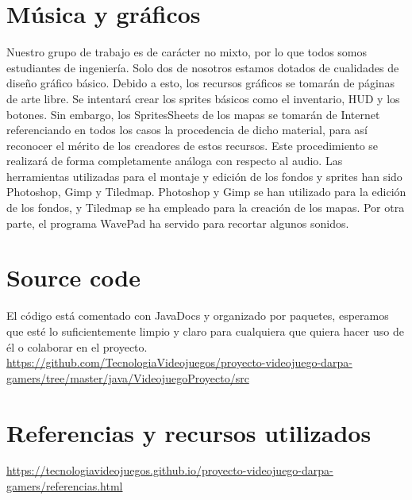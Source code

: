 \section{Música y gráficos}
Nuestro grupo de trabajo es de carácter no mixto, por lo que todos somos estudiantes de ingeniería. Solo dos de nosotros estamos dotados de cualidades de diseño gráfico básico. Debido a esto, los recursos gráficos se tomarán de páginas de arte libre. Se intentará crear los sprites básicos como el inventario, HUD y los botones. Sin embargo, los SpritesSheets de los mapas se tomarán de Internet referenciando en todos los casos la procedencia de dicho material, para así reconocer el mérito de los creadores de estos recursos. Este procedimiento se realizará de forma completamente análoga con respecto al audio.
Las herramientas utilizadas para el montaje y edición de los fondos y sprites han sido Photoshop, Gimp y Tiledmap. Photoshop y Gimp se han utilizado para la edición de los fondos, y Tiledmap se ha empleado para la creación de los mapas. Por otra parte, el programa WavePad ha servido para recortar algunos sonidos. 

\section{Source code}
El código está comentado con JavaDocs y organizado por paquetes, esperamos que esté lo suficientemente limpio y claro para cualquiera que quiera hacer uso de él o colaborar en el proyecto.\newline
\newline
\url{https://github.com/TecnologiaVideojuegos/proyecto-videojuego-darpa-gamers/tree/master/java/VideojuegoProyecto/src} 

\section{Referencias y recursos utilizados}

\url{https://tecnologiavideojuegos.github.io/proyecto-videojuego-darpa-gamers/referencias.html}

